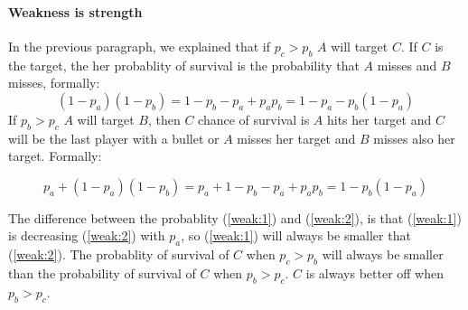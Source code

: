 \documentclass[letterpaper]{article}
\begin{document}
\paragraph{Weakness is strength}

In the previous paragraph, we explained that if $p_c > p_b$
$A$ will target $C$. If $C$ is the target, the her probablity of survival
is the probability that $A$ misses and $B$ misses,
formally:
\begin{equation}
    \label{weak:1}
    (1 - p_a)(1 - p_b) = 1 - p_b - p_a + p_ap_b = 1 - p_a - p_b(1 - p_a)
\end{equation}
If $p_b > p_c$ $A$ will target $B$, then $C$ chance of survival is $A$ hits
her target and $C$ will be the last player with a bullet or $A$
misses her target and $B$ misses also her target. Formally:

\begin{equation}
    \label{weak:2}
    p_a + (1 - p_a)(1 - p_b) =
    p_a + 1 - p_b - p_a + p_ap_b = 1 - p_b(1 - p_a)
\end{equation}

The difference between the probablity (\ref{weak:1}) and (\ref{weak:2}), is that
(\ref{weak:1}) is decreasing (\ref{weak:2})
with $p_a$, so (\ref{weak:1}) will
always be smaller that (\ref{weak:2}). The probablity of
survival of $C$ when $p_c > p_b$ will always be smaller than
the probability of survival of $C$ when $p_b > p_c$. $C$ is always better off
when $p_b > p_c$.
\end{document}

